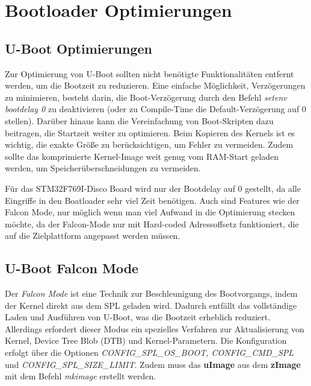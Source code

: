 
\section{Bootloader Optimierungen}

\subsection{U-Boot Optimierungen}
Zur Optimierung von U-Boot sollten nicht benötigte Funktionalitäten entfernt werden, um die Bootzeit zu
reduzieren. Eine einfache Möglichkeit, Verzögerungen zu minimieren, besteht darin, die Boot-Verzögerung durch
den Befehl \textit{setenv bootdelay 0} zu deaktivieren (oder zu Compile-Time die Default-Verzögerung auf 0
stellen). Darüber hinaus kann die Vereinfachung von Boot-Skripten dazu beitragen, die Startzeit weiter zu
optimieren. Beim Kopieren des Kernels ist es wichtig, die exakte Größe zu berücksichtigen, um Fehler zu
vermeiden. Zudem sollte das komprimierte Kernel-Image weit genug vom RAM-Start geladen werden, um
Speicherüberschneidungen zu vermeiden.

Für das STM32F769I-Disco Board wird nur der Bootdelay auf 0 gestellt, da alle Eingriffe in den Boatloader sehr
viel Zeit benötigen. Auch sind Features wie der Falcon Mode, nur möglich wenn man viel Aufwand in die
Optimierung stecken möchte, da der Falcon-Mode nur mit Hard-coded Adressoffsetz funktioniert, die auf die
Zielplattform angepasst werden müssen.

\subsection{U-Boot Falcon Mode}
Der \textit{Falcon Mode} ist eine Technik zur Beschleunigung des Bootvorgangs, indem der Kernel direkt aus dem
SPL geladen wird. Dadurch entfällt das vollständige Laden und Ausführen von U-Boot, was die Bootzeit erheblich
reduziert. Allerdings erfordert dieser Modus ein spezielles Verfahren zur Aktualisierung von Kernel, Device
Tree Blob (DTB) und Kernel-Parametern. Die Konfiguration erfolgt über die Optionen
\textit{CONFIG\_SPL\_OS\_BOOT, CONFIG\_CMD\_SPL} und \textit{CONFIG\_SPL\_SIZE\_LIMIT}. Zudem muss das
\textbf{uImage} aus dem \textbf{zImage} mit dem Befehl \textit{mkimage} erstellt werden.

